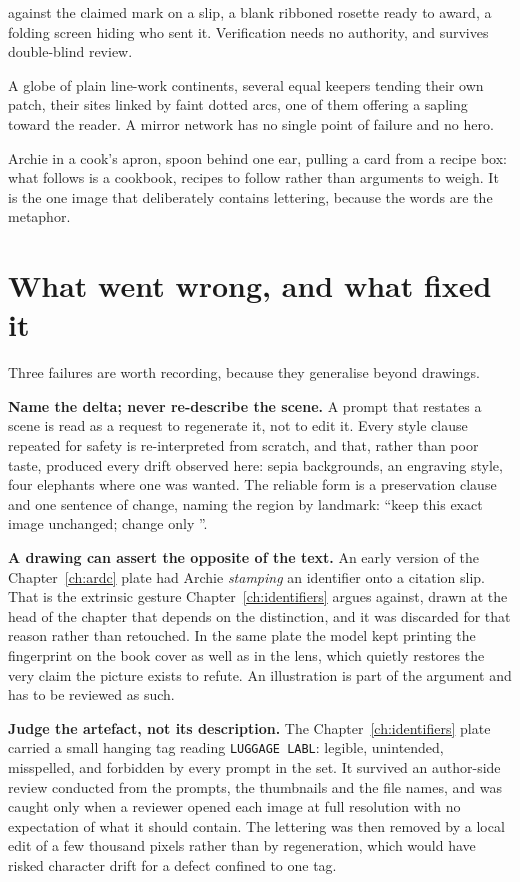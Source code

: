 \begin{description}[leftmargin=1.2em,itemsep=2pt,topsep=3pt,font=\normalfont\itshape]
    against the claimed mark on a slip, a blank ribboned rosette ready to award, a folding screen
    hiding who sent it. Verification needs no authority, and survives double-blind review.
  \item[Chapter~\ref{ch:outlook}.] A globe of plain line-work continents, several equal keepers
    tending their own patch, their sites linked by faint dotted arcs, one of them offering a
    sapling toward the reader. A mirror network has no single point of failure and no hero.
  \item[Appendices.] Archie in a cook's apron, spoon behind one ear, pulling a card from a recipe
    box: what follows is a cookbook, recipes to follow rather than arguments to weigh. It is the
    one image that deliberately contains lettering, because the words are the metaphor.
\end{description}

\section{What went wrong, and what fixed it}

Three failures are worth recording, because they generalise beyond drawings.

\textbf{Name the delta; never re-describe the scene.} A prompt that restates a scene is read as a
request to regenerate it, not to edit it. Every style clause repeated for safety is
re-interpreted from scratch, and that, rather than poor taste, produced every drift observed
here: sepia backgrounds, an engraving style, four elephants where one was wanted. The reliable
form is a preservation clause and one sentence of change, naming the region by landmark:
\enquote{keep this exact image unchanged; change only \textellipsis}.

\textbf{A drawing can assert the opposite of the text.} An early version of the
Chapter~\ref{ch:ardc} plate had Archie \emph{stamping} an identifier onto a citation slip. That
is the extrinsic gesture Chapter~\ref{ch:identifiers} argues against, drawn at the head of the
chapter that depends on the distinction, and it was discarded for that reason rather than
retouched. In the same plate the model kept printing the fingerprint on the book cover as well as
in the lens, which quietly restores the very claim the picture exists to refute. An illustration
is part of the argument and has to be reviewed as such.

\textbf{Judge the artefact, not its description.} The Chapter~\ref{ch:identifiers} plate carried
a small hanging tag reading \texttt{LUGGAGE LABL}: legible, unintended, misspelled, and forbidden
by every prompt in the set. It survived an author-side review conducted from the prompts, the
thumbnails and the file names, and was caught only when a reviewer opened each image at full
resolution with no expectation of what it should contain. The lettering was then removed by a
local edit of a few thousand pixels rather than by regeneration, which would have risked
character drift for a defect confined to one tag.

